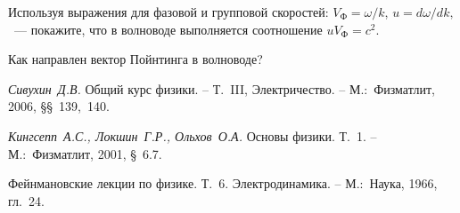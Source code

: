 \begin{lab:questions}

	\item Используя выражения для фазовой и групповой скоростей: $V_{\text{Ф}}=\omega/k$, $u=d\omega/dk,$~--- покажите, что в волноводе выполняется соотношение $uV_{\text{Ф}}=c^2.$
	
	\item Как направлен вектор Пойнтинга в волноводе?
\end{lab:questions}

\begin{lab:literature}

	\item \emph{Сивухин~Д.В.} Общий курс физики. – Т.~III, Электричество. – М.:~Физматлит, 2006, §§~139,~140.
	
	\item \emph{Кингсепп~А.С., Локшин~Г.Р., Ольхов~О.А.} Основы физики. Т.~1. – М.:~Физматлит, 2001, §~6.7.
	
	\item Фейнмановские лекции по физике. Т.~6. Электродинамика. – М.:~Наука, 1966, гл.~24.
	
\end{lab:literature}